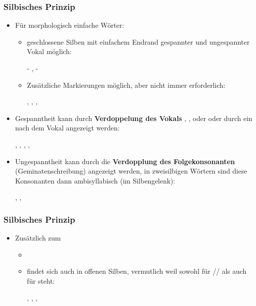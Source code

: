 \begin{frame}
\frametitle{Silbisches Prinzip}

\begin{itemize}
	\item Für morphologisch einfache Wörter:
	
	\begin{itemize}
		\item geschlossene Silben mit einfachem Endrand \ras gespannter und ungespannter Vokal möglich:
		
		  \ea
                   - ,  - 
                  \z
		
		\item Zusätzliche Markierungen möglich, aber nicht immer erforderlich: 
		
		  \ea
                  , , , 
                  \z
		
	\end{itemize}
		
		\item Gespanntheit kann durch \textbf{Verdoppelung des Vokals} , ,  oder  oder durch ein  nach dem Vokal angezeigt werden: 
			
		  \ea
                  , , , , 
                  \z
		
		\item Ungespanntheit kann durch die \textbf{Verdopplung des Folgekonsonanten} (Geminatenschreibung) angezeigt werden, in zweisilbigen Wörtern sind diese Konsonanten dann ambisyllabisch (im Silbengelenk): 
		
		  \ea
                  , , 
                  \z
		
\end{itemize}


\end{frame}


\begin{frame}
\frametitle{Silbisches Prinzip}

\begin{itemize}
	\item Zusätzlich zum 
	
	\begin{itemize}
		\item[]
		\item {} findet sich auch in offenen Silben, vermutlich weil  sowohl für /\textschwa{}/ als auch für  steht:
		
		  \ea
                  , , ,
                  \z
		
	\end{itemize}
\end{itemize}


\end{frame}



